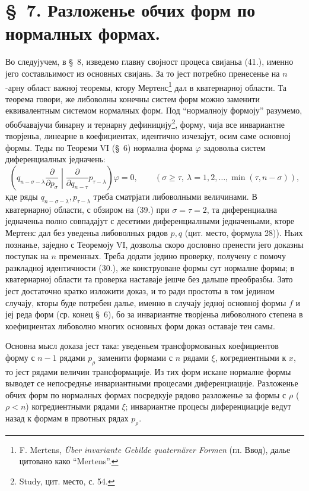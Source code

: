 \documentclass[11pt]{article}
\begin{document}
\section*{\S\ 7. Разложенье обчих форм по нормалных формах.}

Во следујучем, в \S\ 8, изведемо главну својност процеса свијаньа (41.), именно јего составльимост из основных свијань. За то јест потребно пренесенье на $n$-арну област важној теоремы, ктору Мертенс\footnote{F. Mertens, \emph{\"Uber invariante Gebilde quatern\"arer Formen} (гл. Ввод), далье цитовано како ``Mertens''.} дал в кватернарној области. Та теорема говори, же либоволны конечны систем форм можно заменити еквивалентным системом нормалных форм. Под ``нормалноју формоју'' разумемо, обобчавајучи бинарну и тернарну дефиницију\footnote{Study, цит. место, с. 54.}, форму, чија все инвариантне творјеньа, линеарне в коефициентах, идентично изчезајут, осим саме основној формы. Теды по Теореми VI (\S\ 6) нормална форма $\varphi$ задовольа систем диференциалных једначень:
\begin{equation}
 \left(q_{n-\sigma-\lambda}\frac{\partial}{\partial p_\sigma}\middle|\frac{\partial}{\partial q_{n-\tau}}p_{\tau-\lambda}\right)\varphi=0,
 \qquad(\sigma\ge\tau,\ \lambda=1,2,\ldots,\min(\tau,n-\sigma)),
\tag{46}
\end{equation}
кде ряды $q_{n-\sigma-\lambda},p_{\tau-\lambda}$ треба сматрјати либоволными величинами. В кватернарној области, с обзиром на (39.) при $\sigma=\tau=2$, та диференциална једначеньа полно совпадајут с десетими диференциалными једначеньами, кторе Мертенс дал без уведеньа либоволных рядов $p,q$ (цит. место, формула 28)). Ньих познанье, заједно с Теоремоју VI, дозвольа скоро дословно пренести јего доказны поступак на $n$ пременных. Треба додати једино проверку, получену с помочу разкладној идентичности (30.), же конструоване формы сут нормалне формы; в кватернарној области та проверка наставаје јешче без дальше преобразбы. Зато јест достаточно кратко изложити доказ, и то ради простоты в том једином случају, кторы буде потребен далье, именно в случају једној основној формы $f$ и јеј реда форм (ср. конец \S\ 6), бо за инвариантне творјеньа либоволного степена в коефициентах либоволно многих основных форм доказ оставаје тен самы.

Основна мысл доказа јест така: уведеньем трансформованых коефициентов форму с $n-1$ рядами $p_\rho$ заменити формами с $n$ рядами $\xi$, когредиентными к $x$, то јест рядами величин трансформације. Из тих форм искане нормалне формы выводет се непосреднье инвариантными процесами диференциације. Разложенье обчих форм по нормалных формах посредкује рядово разложенье за формы с $\rho$ ($\rho<n$) когредиентными рядами $\xi$; инвариантне процесы диференциације ведут назад к формам в првотных рядах $p_\rho$.
\end{document}

